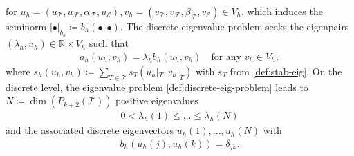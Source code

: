 \documentclass[a4paper]{amsart}
\numberwithin{equation}{section}
\def\F{\mathcal{F}}
\def\E{\mathcal{E}}
\def\T{\mathcal{T}}
\theoremstyle{definition}
\theoremstyle{remark}
\numberwithin{theorem}{section}
\numberwithin{equation}{section}
\numberwithin{table}{section}
\numberwithin{figure}{section}
\begin{document}
for $u_h = (u_\T, u_\F, \alpha_\F, u_\E), v_h = (v_\T, v_\F, \beta_\F, v_\E) \in V_h$, which induces the seminorm $|\bullet|_{b_h} \coloneqq b_h(\bullet,\bullet)$.
The discrete eigenvalue problem seeks the eigenpairs $(\lambda_h, u_h) \in \mathbb{R} \times V_h$ such that
\begin{align}\label{def:discrete-eig-problem}
	a_h(u_h,v_h) = \lambda_h b_h(u_h,v_h) \quad\text{for any } v_h \in V_h,
\end{align}
where $s_h(u_h, v_h) \coloneqq \sum_{T \in \T} s_T(u_h|_T, v_h|_T)$ with $s_T$ from 
\eqref{def:stab-eig}. On the discrete level,
the eigenvalue problem \eqref{def:discrete-eig-problem} leads to $N \coloneqq \dim(P_{k+2}(\T)
)$ positive eigenvalues
\begin{align*}
	0 < \lambda_h(1) \leq \dots \leq \lambda_h(N)
\end{align*}
and the associated discrete eigenvectors $u_h(1), \dots, u_h(N)$ with
\begin{align*}
	b_h(u_h(j),u_h(k)) = \delta_{jk}.
\end{align*}
\end{document}
